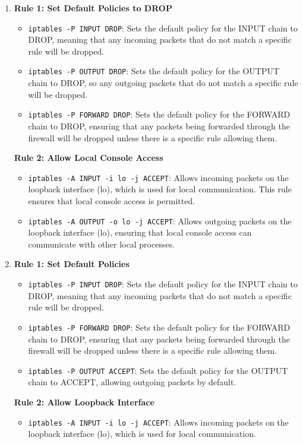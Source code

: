 {\begin{enumerate}
	\item \textbf{Rule 1: Set Default Policies to DROP}
	\begin{itemize}
		\item \texttt{iptables -P INPUT DROP}: Sets the default policy for the INPUT chain to DROP, meaning that any incoming packets that do not match a specific rule will be dropped.
		\item \texttt{iptables -P OUTPUT DROP}: Sets the default policy for the OUTPUT chain to DROP, so any outgoing packets that do not match a specific rule will be dropped.
		\item \texttt{iptables -P FORWARD DROP}: Sets the default policy for the FORWARD chain to DROP, ensuring that any packets being forwarded through the firewall will be dropped unless there is a specific rule allowing them.
	\end{itemize}
	
	\textbf{Rule 2: Allow Local Console Access}
	\begin{itemize}
		\item \texttt{iptables -A INPUT -i lo -j ACCEPT}: Allows incoming packets on the loopback interface (lo), which is used for local communication. This rule ensures that local console access is permitted.
		\item \texttt{iptables -A OUTPUT -o lo -j ACCEPT}: Allows outgoing packets on the loopback interface (lo), ensuring that local console access can communicate with other local processes.
	\end{itemize}

	\item \textbf{Rule 1: Set Default Policies}
	\begin{itemize}
		\item \texttt{iptables -P INPUT DROP}: Sets the default policy for the INPUT chain to DROP, meaning that any incoming packets that do not match a specific rule will be dropped.
		\item \texttt{iptables -P FORWARD DROP}: Sets the default policy for the FORWARD chain to DROP, ensuring that any packets being forwarded through the firewall will be dropped unless there is a specific rule allowing them.
		\item \texttt{iptables -P OUTPUT ACCEPT}: Sets the default policy for the OUTPUT chain to ACCEPT, allowing outgoing packets by default.
	\end{itemize}
	
	\textbf{Rule 2: Allow Loopback Interface}
	\begin{itemize}
		\item \texttt{iptables -A INPUT -i lo -j ACCEPT}: Allows incoming packets on the loopback interface (lo), which is used for local communication.
	\end{itemize}
	

\end{enumerate}}
